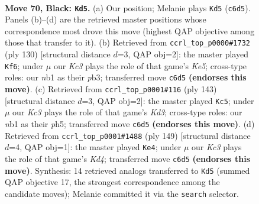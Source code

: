 \documentclass[11pt]{article}
\begin{document}
\clearpage

\begin{figure}[p]\centering
\begin{subfigure}{0.46\textwidth}\centering
\resizebox{\linewidth}{!}{%
\newchessgame
\chessboard[
  setfen={5B2/8/2k5/p7/2p3b1/8/5K2/1N6 b - - 9 70},
  showmover=false,
  pgfstyle=straightmove, color=movearrow, markmove={c6-d5}
]}
\caption{}
\end{subfigure}\hfill
\begin{subfigure}{0.46\textwidth}\centering
\resizebox{\linewidth}{!}{%
\newchessgame
\chessboard[
  setfen={5B2/3k4/6b1/4K3/8/1p2P3/1P6/8 w - - 7 66},
  showmover=false,
  pgfstyle=straightmove, color=movearrow, markmove={e5-f6}
]}
\caption{}
\end{subfigure}
\\[4pt]
\begin{subfigure}{0.46\textwidth}\centering
\resizebox{\linewidth}{!}{%
\newchessgame
\chessboard[
  setfen={8/8/3k3p/7P/1p6/1B1K4/1b6/8 b - - 2 72},
  showmover=false,
  pgfstyle=straightmove, color=movearrow, markmove={d6-c5}
]}
\caption{}
\end{subfigure}\hfill
\begin{subfigure}{0.46\textwidth}\centering
\resizebox{\linewidth}{!}{%
\newchessgame
\chessboard[
  setfen={8/8/5p2/3k3b/8/8/1P1K3B/8 b - - 5 75},
  showmover=false,
  pgfstyle=straightmove, color=movearrow, markmove={d5-e4}
]}
\caption{}
\end{subfigure}
\caption{\textbf{Move 70, Black: \texttt{Kd5}.} (a) Our position; Melanie plays \texttt{Kd5} (\texttt{c6d5}). Panels (b)--(d) are the retrieved master positions whose correspondence most drove this move (highest QAP objective among those that transfer to it). (b) Retrieved from \texttt{ccrl\_top\_p0000\#1732} (ply 130) [structural distance $d$=3, QAP obj=2]: the master played \texttt{Kf6}; under $\mu$ our \emph{Kc3} plays the role of that game's \emph{Ke5}; cross-type roles: our \emph{n}b1 as their \emph{p}b3; transferred move \texttt{c6d5} \textbf{(endorses this move)}. (c) Retrieved from \texttt{ccrl\_top\_p0001\#116} (ply 143) [structural distance $d$=3, QAP obj=2]: the master played \texttt{Kc5}; under $\mu$ our \emph{Kc3} plays the role of that game's \emph{Kd3}; cross-type roles: our \emph{n}b1 as their \emph{p}h5; transferred move \texttt{c6d5} \textbf{(endorses this move)}. (d) Retrieved from \texttt{ccrl\_top\_p0001\#1488} (ply 149) [structural distance $d$=4, QAP obj=1]: the master played \texttt{Ke4}; under $\mu$ our \emph{Kc3} plays the role of that game's \emph{Kd4}; transferred move \texttt{c6d5} \textbf{(endorses this move)}. Synthesis: 14 retrieved analogs transferred to \texttt{Kd5} (summed QAP objective 17, the strongest correspondence among the candidate moves); Melanie committed it via the \texttt{search} selector.}
\label{fig:thought-m139}
\end{figure}
\end{document}
